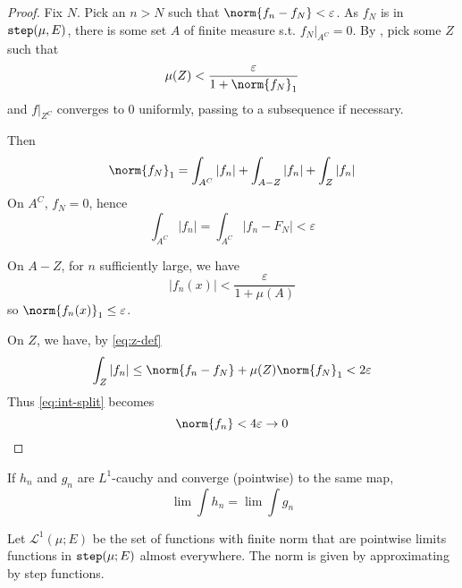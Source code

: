 \documentclass{scrartcl}
\begin{document}
\begin{proof}
  Fix $N$. Pick an $n>N$ such that $\norm{f_n-f_N}<\varepsilon$. As $f_N$ is in $\mathtt{step}(\mu,E)$, there is some set $A$ of finite measure s.t. $f_N|_{A^C}=0$. By , pick some $Z$ such that
  \begin{equation}
    \mu(Z)<\frac{\varepsilon}{1+\norm{f_N}_1}
    \label{eq:z-def}
  \end{equation}
  and $f|_{Z^C}$ converges to $0$ uniformly, passing to a subsequence if necessary. 
  
  Then
  \begin{equation}
  \norm{f_N}_1= \int_{A^C} |f_n| + \int_{A-Z} |f_n| +\int_Z |f_n|
  \label{eq:int-split}
  \end{equation}
  On $A^C$, $f_N=0$, hence
  \[
  \int_{A^C} |f_n|=\int_{A^C} |f_n-F_N| <\varepsilon
  \]

  On $A-Z$, for $n$ sufficiently large, we have
  \[
  |f_n(x)|< \frac \varepsilon {1+\mu(A)}
  \]
  so $\norm{f_n(x)}_1 \leq \varepsilon$. 

  On $Z$, we have, by \cref{eq:z-def}
  \[
  \int_Z |f_n| \leq \norm{f_n-f_N} +\mu(Z)\norm {f_N}_1 < 2\varepsilon 
  \]
  Thus \cref{eq:int-split} becomes
  \[
  \norm{f_n}< 4\varepsilon \to 0
  \]
\end{proof}
\begin{cor}
  If $h_n$ and $g_n$ are $L^1$-cauchy and converge (pointwise) to the same map,
  \[
  \lim\int h_n = \lim\int g_n
  \]
\end{cor}
\begin{defn}[$\mathscr L^1$]
  Let $\mathscr L^1(\mu;E)$ be the set of functions with finite norm that are pointwise limits functions in $\mathtt{step}(\mu;E)$ almost everywhere. The norm is given by approximating by step functions. 
\end{defn}
\end{document}
